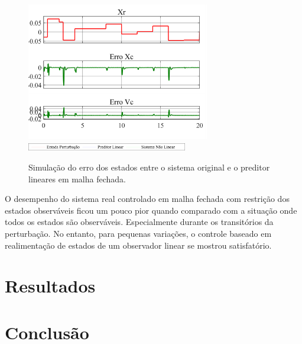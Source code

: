 \documentclass[a4paper]{ifacconf}
\begin{document}
    \FloatBarrier
    \begin{figure}[htbp]
        \begin{centering}
            \includegraphics[width=8cm]{img/simulaca_temporal_preditor_linear_erro.png}
            \includegraphics[width=7cm]{img/simulaca_temporal_preditor_linear_erro_leg.png}
            \caption{Simulação do erro dos estados entre o sistema original e o preditor lineares em malha fechada.}
            \label{fig:simulaca_temporal_linear_perturbacao}
        \end{centering}
    \end{figure}
    \FloatBarrier

    O desempenho do sistema real controlado em malha fechada com restrição dos estados observáveis ficou um pouco pior quando comparado com a situação onde todos os estados são observáveis. Especialmente durante os transitórios da perturbação. No entanto, para pequenas variações, o controle baseado em realimentação de estados de um observador linear se mostrou satisfatório.

    \section{Resultados}
    \section{Conclusão}
    
    
    
    \appendix
\end{document}
